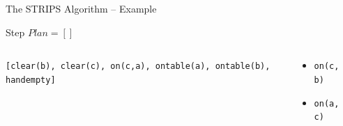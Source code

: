 \documentclass[presentation]{beamer}\mode<presentation>{\usetheme{AMSBolognaFC}}
\begin{document}
\begin{frame}[c]{The STRIPS Algorithm -- Example}
\small

    \begin{exampleblock}{Step \nextStripsExampleStep{} \hfill $Plan = []$}
        \begin{columns}[t]
            \begin{column}{.30\linewidth}\centering
                \texttt{[clear(b), clear(c), on(c,a), ontable(a), ontable(b), handempty]}
            \end{column}
            \begin{column}{.50\linewidth}\centering
                \begin{itemize}
                    \item \texttt{on(c,b)}
                    \item \texttt{on(a,c)}
                \end{itemize}
            \end{column}
            \begin{column}{.10\linewidth}\centering
                
            \end{column}
        \end{columns}
    \end{exampleblock}

\end{frame}
\end{document}
